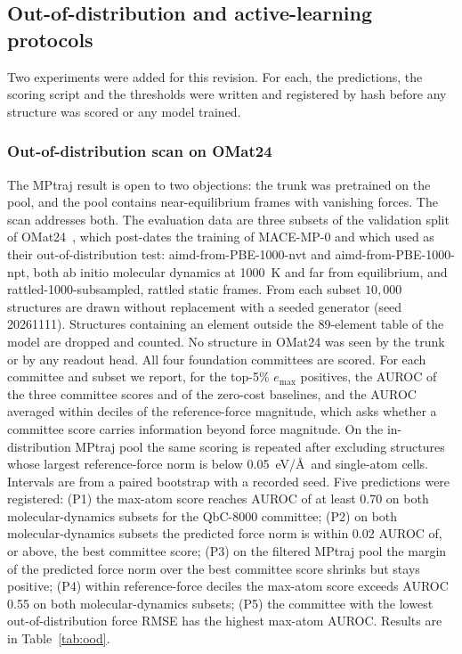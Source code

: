 \subsection{Out-of-distribution and active-learning protocols}
\label{sec:protocols}

Two experiments were added for this revision. For each, the predictions, the
scoring script and the thresholds were written and registered by hash before
any structure was scored or any model trained.

\subsubsection{Out-of-distribution scan on OMat24}

The MPtraj result is open to two objections: the trunk was pretrained on the
pool, and the pool contains near-equilibrium frames with vanishing forces. The
scan addresses both. The evaluation data are three subsets of the validation
split of OMat24~\citep{barrosoluque2024omat24}, which post-dates the training
of MACE-MP-0 and which \citet{beck2025committee} used as their
out-of-distribution test: aimd-from-PBE-1000-nvt and aimd-from-PBE-1000-npt,
both ab initio molecular dynamics at 1000~K and far from equilibrium, and
rattled-1000-subsampled, rattled static frames. From each subset $10{,}000$
structures are drawn without replacement with a seeded generator (seed
20261111). Structures containing an element outside the 89-element table of
the model are dropped and counted. No structure in OMat24 was seen by the
trunk or by any readout head. All four foundation committees are scored. For
each committee and subset we report, for the top-5\% $e_{\max}$ positives,
the AUROC of the three committee scores and of the zero-cost baselines, and
the AUROC averaged within deciles of the reference-force magnitude, which asks
whether a committee score carries information beyond force magnitude. On the
in-distribution MPtraj pool the same scoring is repeated after excluding
structures whose largest reference-force norm is below 0.05~eV/\AA\ and
single-atom cells. Intervals are from a paired bootstrap with a recorded seed.
Five predictions were registered: (P1) the max-atom score reaches AUROC of at
least 0.70 on both molecular-dynamics subsets for the QbC-8000 committee;
(P2) on both molecular-dynamics subsets the predicted force norm is within
0.02 AUROC of, or above, the best committee score; (P3) on the filtered MPtraj
pool the margin of the predicted force norm over the best committee score
shrinks but stays positive; (P4) within reference-force deciles the max-atom
score exceeds AUROC 0.55 on both molecular-dynamics subsets; (P5) the
committee with the lowest out-of-distribution force RMSE has the highest
max-atom AUROC. Results are in Table~\ref{tab:ood}.

